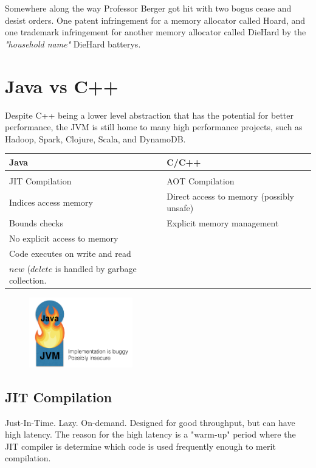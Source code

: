 \documentclass[twoside]{article}
\begin{document}
Somewhere along the way Professor Berger got hit with two bogus cease and desist orders. One patent infringement for a memory allocator called Hoard, and one trademark infringement for another memory allocator called DieHard by the \emph{"household name"} DieHard batterys.  

\section{Java vs C++}

Despite C++ being a lower level abstraction that has the potential for better performance, the JVM is still home to many high performance projects, such as Hadoop, Spark, Clojure, Scala, and DynamoDB.

\begin{tabular}{l | l}
Java & C/C++ \\
\hline \\
JIT Compilation & AOT Compilation \\ 
Indices access memory & Direct access to memory (possibly unsafe)\\
Bounds checks & Explicit memory management\\
No explicit access to memory & \\
Code executes on write and read & \\
$new$ ($delete$ is handled by garbage collection. & \\
\end{tabular}

\begin{figure}[h]
\begin{center}
\includegraphics[width=0.4\textwidth]{fire.png}
\end{center}
\end{figure}

\subsection{JIT Compilation}

Just-In-Time. Lazy. On-demand. Designed for good throughput, but can have high latency. The reason for the high latency is a "warm-up" period where the JIT compiler is determine which code is used frequently enough to merit compilation.
\end{document}
